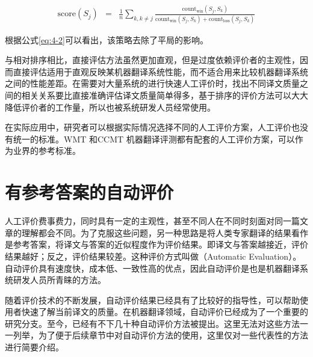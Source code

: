 \begin{itemize}
\begin{itemize}
\begin{eqnarray}
\textrm{score}({{S}_j}) &=& \frac{1}{n}\sum\limits_{k,k \ne j} {\frac{\textrm{count}_{\textrm{win}}({{S}_j},{{S}_k})}{{\textrm{count}_{\textrm{win}}({{S}_j},{{S}_k}) + \textrm{count}_{\textrm{loss}}({{S}_j},{{S}_k})}}}
\label{eq:4-2}
\end{eqnarray}

根据公式\eqref{eq:4-2}可以看出，该策略去除了平局的影响。
    \end{itemize}
\vspace{0.5em}
\end{itemize}

\parinterval 与相对排序相比，直接评估方法虽然更加直观，但是过度依赖评价者的主观性，因而直接评估适用于直观反映某机器翻译系统性能，而不适合用来比较机器翻译系统之间的性能差距。在需要对大量系统的进行快速人工评价时，找出不同译文质量之间的相关关系要比直接准确评估译文质量简单得多，基于排序的评价方法可以大大降低评价者的工作量，所以也被系统研发人员经常使用。

\parinterval 在实际应用中，研究者可以根据实际情况选择不同的人工评价方案，人工评价也没有统一的标准。WMT 和CCMT 机器翻译评测都有配套的人工评价方案，可以作为业界的参考标准。

\sectionnewpage
\section{有参考答案的自动评价}\label{Automatic evaluation with reference answers}

\parinterval 人工评价费事费力，同时具有一定的主观性，甚至不同人在不同时刻面对同一篇文章的理解都会不同。为了克服这些问题，另一种思路是将人类专家翻译的结果看作是参考答案，将译文与答案的近似程度作为评价结果。即译文与答案越接近，评价结果越好；反之，评价结果较差。这种评价方式叫做{\small{}}（Automatic Evaluation）。自动评价具有速度快，成本低、一致性高的优点，因此自动评价是也是机器翻译系统研发人员所青睐的方法。

\parinterval 随着评价技术的不断发展，自动评价结果已经具有了比较好的指导性，可以帮助使用者快速了解当前译文的质量。在机器翻译领域，自动评价已经成为了一个重要的研究分支。至今，已经有不下几十种自动评价方法被提出。这里无法对这些方法一一列举，为了便于后续章节中对自动评价方法的使用，这里仅对一些代表性的方法进行简要介绍。

